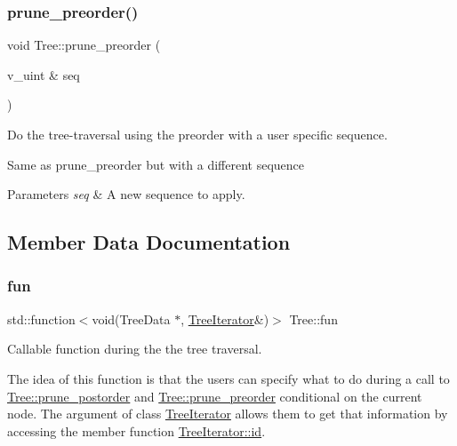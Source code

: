 \subsubsection{\texorpdfstring{prune\+\_\+preorder()}{prune\_preorder()}\hspace{0.1cm}{\footnotesize\ttfamily [2/2]}}
{\footnotesize\ttfamily void Tree\+::prune\+\_\+preorder (\begin{DoxyParamCaption}\item[{v\+\_\+uint \&}]{seq }\end{DoxyParamCaption})\hspace{0.3cm}{\ttfamily [inline]}}



Do the tree-\/traversal using the preorder with a user specific sequence. 

Same as {\ttfamily prune\+\_\+preorder} but with a different sequence 
\begin{DoxyParams}{Parameters}
{\em seq} & A new sequence to apply. \\
\hline
\end{DoxyParams}


\subsection{Member Data Documentation}
\mbox{\label{classTree_a92a3c76480465109fea154e2f2cab4ab}} 
\subsubsection{\texorpdfstring{fun}{fun}}
{\footnotesize\ttfamily std\+::function$<$void(Tree\+Data $\ast$, \hyperlink{classTreeIterator}{Tree\+Iterator}\&)$>$ Tree\+::fun}



Callable function during the the tree traversal. 

The idea of this function is that the users can specify what to do during a call to \hyperlink{classTree_a7d465880d18acf79f3a772ea5412b0d7}{Tree\+::prune\+\_\+postorder} and \hyperlink{classTree_ac85bfb083b3856e65987e1d15885a61c}{Tree\+::prune\+\_\+preorder} conditional on the current node. The argument of class \hyperlink{classTreeIterator}{Tree\+Iterator} allows them to get that information by accessing the member function \hyperlink{classTreeIterator_a1ad0126da70f20e1b0c5ab71940edbfe}{Tree\+Iterator\+::id}. \mbox{\label{classTree_a310e76b803db38e7067514822b21a58f}} 
